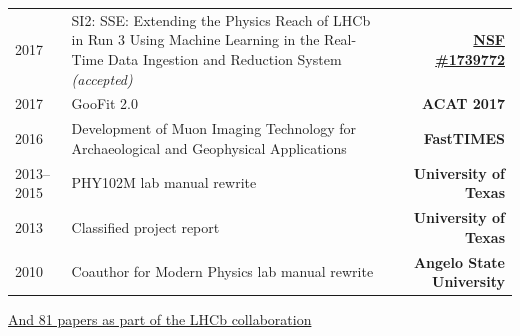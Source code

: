 \documentclass[10pt,letterpaper,english]{moderncv}
\begin{document}
\let\oldnullthing\null
\renewcommand{\null}{}
\makecvtitle
\renewcommand{\null}{\oldnullthing}
\vspace*{-10mm}


\begin{tabularx}{\textwidth}{p{.8in}X>{\bfseries}r}

    2017 & SI2: SSE: Extending the Physics Reach of LHCb in Run 3 Using Machine Learning in the Real-Time Data Ingestion and Reduction System  \textit{(accepted)} & \href{https://nsf.gov/awardsearch/showAward?AWD_ID=1739772}{NSF \#1739772} \\ %
    2017 & GooFit 2.0 & ACAT 2017 \\ %
    2016 & Development of Muon Imaging Technology
    for Archaeological and Geophysical Applications & FastTIMES \\
    2013--2015 & PHY102M lab manual rewrite & University of Texas \\
    2013 & Classified project report & University of Texas\\
    2010 & Coauthor for Modern Physics lab manual rewrite & Angelo State University\\
\end{tabularx}
\href{http://inspirehep.net/search?ln=en&p=find+jy+2017+or+jy+2018+and+author+schreiner+and+author+sokoloff&of=hb&action_search=Search&sf=earliestdate&so=d}
{And 81 papers as part of the LHCb collaboration}

\end{document}
